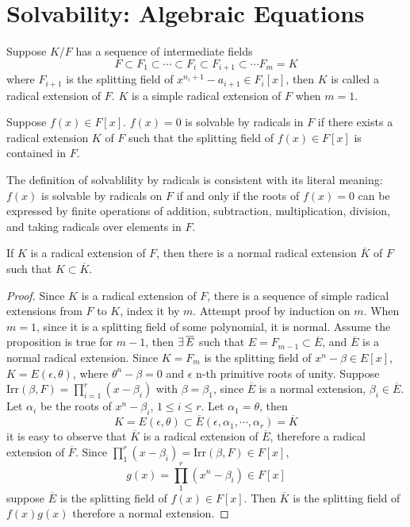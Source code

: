 \section{Solvability: Algebraic Equations}
\begin{definition}
    Suppose $K/F$ has a sequence of intermediate fields
    $$
    F\subset F_1\subset\cdots\subset F_i\subset F_{i+1}\subset\cdots F_m=K
    $$
    where $F_{i+1}$ is the splitting field of $x^{n_i+1}-a_{i+1}\in F_{i}[x]$, then $K$ is called a radical extension of $F$. $K$ is a simple radical extension of $F$ when $m=1$.
\end{definition}
\begin{definition}
    Suppose $f(x)\in F[x]$. $f(x)=0$ is solvable by radicals in $F$ if there exists a radical extension $K$ of $F$ such that the splitting field of $f(x)\in F[x]$ is contained in $F$.
\end{definition}
\begin{remark}
    The definition of solvablility by radicals is consistent with its literal meaning: $f(x)$ is solvable by radicals on $F$ if and only if the roots of $f(x)=0$ can be expressed by finite operations of addition, subtraction, multiplication, division, and taking radicals over elements in $F$.
\end{remark}
\begin{proposition}\label{solvable-ext-wlog-normal}
    If $K$ is a radical extension of $F$, then there is a normal radical extension $\overline{K}$ of $F$ such that $K\subset\overline{K}$.
\end{proposition}
\begin{proof}
    Since $K$ is a radical extension of $F$, there is a sequence of simple radical extensions from $F$ to $K$, index it by $m$. Attempt proof by induction on $m$. When $m=1$, since it is a splitting field of some polynomial, it is normal. Assume the proposition is true for $m-1$, then $\exists\,\overline{E}$ such that $E=F_{m-1}\subset\overline{E}$, and $\overline{E}$ is a normal radical extension. Since $K=F_m$ is the splitting field of $x^n-\beta\in E[x]$, $K=E(\epsilon,\theta)$, where $\theta^n-\beta=0$ and $\epsilon$ n-th primitive roots of unity. Suppose $\mathrm{Irr}(\beta,F)=\prod^r_{i=1}(x-\beta_i)$ with $\beta=\beta_1$, since $\overline{E}$ is a normal extension, $\beta_i\in\overline{E}$. Let $\alpha_i$ be the roots of $x^n-\beta_i$, $1\le i\le r$. Let $\alpha_1=\theta$, then
    $$
    K=E(\epsilon,\theta)\subset\overline{E}(\epsilon,\alpha_1,\cdots,\alpha_r)=\overline{K}
    $$
    it is easy to observe that $\overline{K}$ is a radical extension of $\overline{E}$, therefore a radical extension of $\overline{F}$. Since $\prod^r_1(x-\beta_i)=\mathrm{Irr}(\beta,F)\in F[x]$,
    $$
    g(x)=\prod^r_1(x^n-\beta_i)\in F[x]
    $$
    suppose $\overline{E}$ is the splitting field of $f(x)\in F[x]$. Then $\overline{K}$ is the splitting field of $f(x)g(x)$ therefore a normal extension.
\end{proof}
